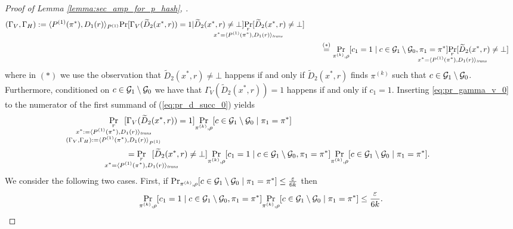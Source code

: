 \begin{proof}[Proof of Lemma \ref{lemma:sec_amp_for_p_hash}, \cite{holenstein2011general}]
\begin{align}
{{{        (\Gamma_V, \Gamma_H) := \langle P^{(1)}(\pi^*), D_1(r) \rangle_{P^{(1)}} }}}
  {\Pr}[\Gamma_V(\widetilde{D}_2(x^*, r)) = 1 | \widetilde{D}_2(x^*,r) \neq \bot]
  \underset{\mathclap{\substack{r \\ x^* = \langle P^{(1)}(\pi^*), D_1(r) \rangle_{\mathit{trans}}}}}{\Pr}[\widetilde{D}_2(x^*,r) \neq \bot] \notag\\
  &\IndI \stackrel{(*)}{=}
  \underset{\pi^{(k)}, \rho}{\Pr}[c_1 = 1 \mid c \in \cG_1 \setminus \cG_0, \pi_1 = \pi^*]
  \underset{\mathclap{\substack{r \\ x^* = \langle P^{(1)}(\pi^*), D_1(r) \rangle_{\mathit{trans}}}}} {\Pr}[\widetilde{D}_2(x^*,r) \neq \bot]
\end{align}
where in $(*)$ we use the observation that $\widetilde{D}_2(x^*, r) \neq \bot$ happens if and only if $\widetilde{D}_2(x^*, r)$
finds $\pi^{(k)}$ such that $c \in \mathcal{G}_1 \setminus \mathcal{G}_0$. Furthermore, conditioned on $c \in \mathcal{G}_1 \setminus \mathcal{G}_0$
we have that $\Gamma_V(\widetilde{D}_2(x^*,r)) = 1$ happens if and only if $c_1 = 1$.
Inserting \eqref{eq:pr_gamma_v_0} to the numerator of the first summand of (\ref{eq:pr_d_succ_0}) yields
\begin{align}
  \label{ineq:start_for_case}
\IndI &\underset{
  \mathclap{
  \substack{r \\
    x^* := \langle P^{(1)}(\pi^*), D_1 (r) \rangle_{\mathit{trans}} \\
    (\Gamma_V, \Gamma_H) := \langle P^{(1)}(\pi^*), D_1(r) \rangle_{P^{(1)}} }}}
{\Pr}\mkern13mu[\Gamma_V(\widetilde{D}_2(x^*, r)) = 1]
\underset{\pi^{(k)},\rho}{\Pr}[c \in \cG_1 \setminus \cG_0 \mid \pi_1 = \pi^*] \notag\\
  &\IndI = \underset{\mathclap{\substack{r
      \\ x^* = \langle P^{(1)}(\pi^*), D_1(r) \rangle_{\mathit{trans}}}}}
  {\Pr}\mkern13mu[\widetilde{D}_2(x^*,r) \neq \bot]
  \underset{\pi^{(k)}, \rho}{\Pr}[c_1 = 1 \mid c \in \cG_1 \setminus \cG_0, \pi_1 = \pi^*]
  \underset{\pi^{(k)}, \rho}{\Pr}[c \in \cG_1 \setminus \cG_0 \mid \pi_1 = \pi^*].
\end{align}
We consider the following two cases. First, if $\Pr_{\pi^{(k)}, \rho}[ c \in \mathcal{G}_1 \setminus \mathcal{G}_0 \mid \pi_1 = \pi^*] \leq \frac{\varepsilon}{6k}$ then
\begin{align}
  \label{ineq:case_0}
  \underset{\pi^{(k)}, \rho}{\Pr}[c_1 = 1 \mid c \in \mathcal{G}_1 \setminus \mathcal{G}_0, \pi_1 = \pi^*] \underset{\pi^{(k)}, \rho}{\Pr}[c \in \mathcal{G}_1 \setminus \mathcal{G}_0 \mid \pi_1 = \pi^*] \leq \frac{\varepsilon}{6k}.
\end{align}

\end{proof}
